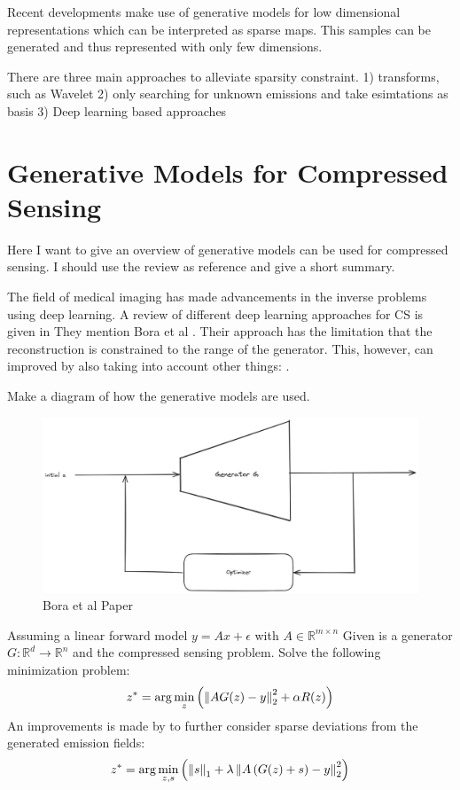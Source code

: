 Recent developments make use of generative models for low dimensional representations which can be interpreted as sparse maps.
This samples can be generated and thus represented with only few dimensions.

There are three main approaches to alleviate sparsity constraint.
1) transforms, such as Wavelet
2) only searching for unknown emissions and take esimtations as basis
3) Deep learning based approaches


\section{Generative Models for Compressed Sensing}
Here I want to give an overview of generative models can be used for compressed sensing.
I should use the review as reference and give a short summary.

The field of medical imaging has made advancements in the inverse problems using deep learning.
A review of different deep learning approaches for CS is given in \parencite{ReviewCSUsingAI}
They mention Bora et al \parencite{CSUsingAI}.
Their approach has the limitation that the reconstruction is constrained to the range of the generator.
This, however, can improved by also taking into account other things: \parencite{SparseCSUsingAI}.

Make a diagram of how the generative models are used.
\begin{figure}[h!]
    \centering
    \includegraphics[width=\textwidth]{figures/02_related_work/bora_et_al.png}
    \caption{Bora et al Paper}
\end{figure}

Assuming a linear forward model $y = Ax + \epsilon$ with $A \in \mathbb{R}^{m \times n}$
Given is a generator $G: \mathbb{R}^d \to \mathbb{R}^n$ and the compressed sensing problem.
Solve the following minimization problem:
\begin{equation}
    z^* = \arg\min_{z}{\left( \left\lVert A G(z) - y\right\rVert_2^2 + \alpha R(z) \right)}
\end{equation}
An improvements is made by to further consider sparse deviations from the generated emission fields:
\begin{equation}
    z^* = \arg\min_{z, s}{\left(\left\lVert s\right\rVert_1 + \lambda \left\lVert A \left( G(z) + s \right) - y\right\rVert_2^2 \right)}
\end{equation}

